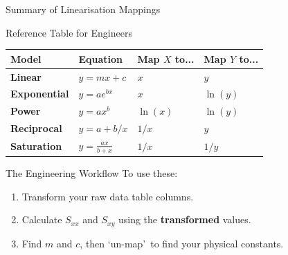 \begin{frame}{Summary of Linearisation Mappings}
    \begin{block}{Reference Table for Engineers}
        \centering
        \small
        \begin{tabular}{l l l l}
            \hline
            \textbf{Model} & \textbf{Equation} & \textbf{Map $X$ to...} & \textbf{Map $Y$ to...} \\
            \hline
            \textbf{Linear} & $y = mx+c$ & $x$ & $y$ \\
            \textbf{Exponential} & $y = ae^{bx}$ & $x$ & $\ln(y)$ \\
            \textbf{Power} & $y = ax^b$ & $\ln(x)$ & $\ln(y)$ \\
            \textbf{Reciprocal} & $y = a + b/x$ & $1/x$ & $y$ \\
            \textbf{Saturation} & $y = \frac{ax}{b+x}$ & $1/x$ & $1/y$ \\
            \hline
        \end{tabular}
    \end{block}

    \begin{alertblock}{The Engineering Workflow}
        To use these:
        \begin{enumerate}
            \item Transform your raw data table columns.
            \item Calculate $S_{xx}$ and $S_{xy}$ using the \textbf{transformed} values.
            \item Find $m$ and $c$, then \lq un-map\rq\ to find your physical constants.
        \end{enumerate}
    \end{alertblock}
\end{frame}


